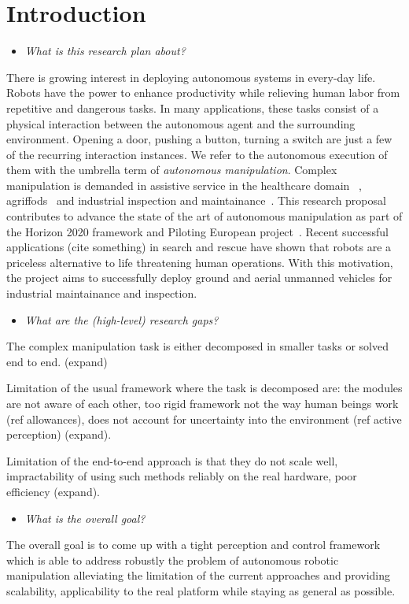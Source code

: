 \section{Introduction}
\label{sec:Introduction}


\begin{itemize}
	\item \emph{What is this research plan about?}
\end{itemize}

There is growing interest in deploying autonomous systems in every-day life. Robots have the power to enhance productivity while relieving human labor from repetitive and dangerous tasks. In many applications, these tasks consist of a physical interaction between the autonomous agent and the surrounding environment. Opening a door, pushing a button, turning a switch are just a few of the recurring interaction instances. We refer to the autonomous execution of them with the umbrella term of \emph{autonomous manipulation}. Complex manipulation is demanded in assistive service in the healthcare domain~\cite{cooper2020ari} , agriffods~\cite{duckett2018agricultural} and industrial inspection and maintainance~\cite{lattanzi2017review}. This research proposal contributes to advance the state of the art of autonomous manipulation as part of the Horizon 2020 framework and Piloting European project~\cite{eu-piloting-2020}. Recent successful applications (cite something) in search and rescue have shown that robots are a priceless alternative to life threatening human operations. With this motivation, the project aims to successfully deploy ground and aerial unmanned vehicles for industrial maintainance and inspection. 

\begin{itemize}
    \item \emph{What are the (high-level) research gaps?}
\end{itemize}

The complex manipulation task is either decomposed in smaller tasks or solved end to end. (expand)

Limitation of the usual framework where the task is decomposed are: the modules are not aware of each other, too rigid framework not the way human beings work (ref allowances), does not account for uncertainty into the environment (ref active perception) (expand). 

Limitation of the end-to-end approach is that they do not scale well, impractability of using such methods reliably on the real hardware, poor efficiency (expand).

\begin{itemize}
    \item \emph{What is the overall goal?}
\end{itemize}

The overall goal is to come up with a tight perception and control framework which is able to address robustly the problem of autonomous robotic manipulation alleviating the limitation of the current approaches and providing scalability, applicability to the real platform while staying as general as possible.
